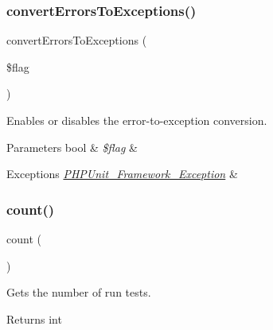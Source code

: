 \subsubsection{\texorpdfstring{convert\+Errors\+To\+Exceptions()}{convertErrorsToExceptions()}}
{\footnotesize\ttfamily convert\+Errors\+To\+Exceptions (\begin{DoxyParamCaption}\item[{}]{\$flag }\end{DoxyParamCaption})}

Enables or disables the error-\/to-\/exception conversion.


\begin{DoxyParams}[1]{Parameters}
bool & {\em \$flag} & \\
\hline
\end{DoxyParams}

\begin{DoxyExceptions}{Exceptions}
{\em \mbox{\hyperlink{class_p_h_p_unit___framework___exception}{P\+H\+P\+Unit\+\_\+\+Framework\+\_\+\+Exception}}} & \\
\hline
\end{DoxyExceptions}
\mbox{\label{class_p_h_p_unit___framework___test_result_ac751e87b3d4c4bf2feb03bee8b092755}} 
\subsubsection{\texorpdfstring{count()}{count()}}
{\footnotesize\ttfamily count (\begin{DoxyParamCaption}{ }\end{DoxyParamCaption})}

Gets the number of run tests.

\begin{DoxyReturn}{Returns}
int 
\end{DoxyReturn}
\mbox{\label{class_p_h_p_unit___framework___test_result_a6de65eea8b294795cbc34c4c8cee8546}} 
